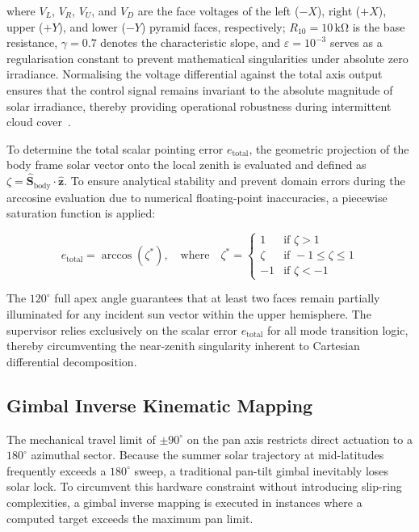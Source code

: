 \documentclass[preprint,3p,12pt]{elsarticle}
\newcommand{\degr}{^{\circ}}
\newcommand{\Svec}{\mathbf{S}}
\begin{document}
where $V_L$, $V_R$, $V_U$, and $V_D$ are the face voltages of the left ($-X$), right ($+X$), upper ($+Y$), and lower ($-Y$) pyramid faces, respectively; $R_{10} = 10\,\mathrm{k\Omega}$ is the base resistance, $\gamma = 0.7$ denotes the characteristic slope, and $\varepsilon = 10^{-3}$ serves as a regularisation constant to prevent mathematical singularities under absolute zero irradiance. Normalising the voltage differential against the total axis output ensures that the control signal remains invariant to the absolute magnitude of solar irradiance, thereby providing operational robustness during intermittent cloud cover~\cite{Hafez2018}.

To determine the total scalar pointing error $e_{\mathrm{total}}$, the geometric projection of the body frame solar vector onto the local zenith is evaluated and defined as $\zeta = \hat{\Svec}_{\mathrm{body}}\cdot\hat{\mathbf{z}}$. To ensure analytical stability and prevent domain errors during the arccosine evaluation due to numerical floating-point inaccuracies, a piecewise saturation function is applied:

\begin{equation}
    e_{\mathrm{total}} = \arccos(\zeta^{*}), \quad \text{where} \quad \zeta^{*} = \begin{cases}
        1 & \text{if } \zeta > 1 \\
        \zeta & \text{if } -1 \leq \zeta \leq 1 \\
        -1 & \text{if } \zeta < -1
    \end{cases}
    \label{eq:e_total}
\end{equation}

The $120\degr$ full apex angle guarantees that at least two faces remain partially illuminated for any incident sun vector within the upper hemisphere. The supervisor relies exclusively on the scalar error $e_{\mathrm{total}}$ for all mode transition logic, thereby circumventing the near-zenith singularity inherent to Cartesian differential decomposition.

\subsection{Gimbal Inverse Kinematic Mapping}
\label{sec:inverse_math}

The mechanical travel limit of $\pm90\degr$ on the pan axis restricts direct actuation to a $180\degr$ azimuthal sector. Because the summer solar trajectory at mid-latitudes frequently exceeds a $180\degr$ sweep, a traditional pan-tilt gimbal inevitably loses solar lock. To circumvent this hardware constraint without introducing slip-ring complexities, a gimbal inverse mapping is executed in instances where a computed target exceeds the maximum pan limit.
\end{document}
